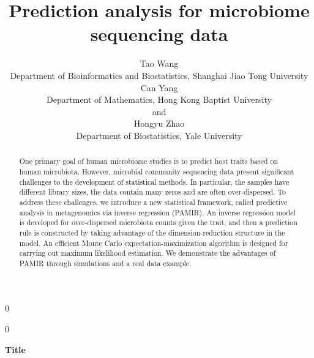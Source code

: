 \documentclass[12pt]{article}
\newcommand{\blind}{0}
\begin{document}
%

\def\spacingset#1{\renewcommand{\baselinestretch}%
{#1}\small\normalsize} \spacingset{1}



\blind
{ \title{\bf Prediction analysis for microbiome sequencing data}
  \author{Tao Wang \\
  \small Department of Bioinformatics and Biostatistics, Shanghai Jiao Tong University\\
  Can Yang \\
  \small Department of Mathematics, Hong Kong Baptist University\\
  and \\
  Hongyu Zhao%
    \\
    \small Department of Biostatistics, Yale University}
  \maketitle
} \fi

\blind
{
  \bigskip
  \bigskip
  \bigskip
  \begin{center}
    {\LARGE\bf Title}
\end{center}
  \medskip
} \fi

\bigskip
\begin{abstract}
One primary goal of human microbiome studies is to predict host traits based on human microbiota. However, microbial community sequencing data present significant challenges to the development of statistical methods. In particular, the samples have different library sizes, the data contain many zeros and are often over-dispersed. To address these challenges, we introduce a new statistical framework, called predictive analysis in metagenomics via inverse regression (PAMIR). An inverse regression model is developed for over-dispersed microbiota counts given the trait, and then a prediction rule is constructed by taking advantage of the dimension-reduction structure in the model. An efficient Monte Carlo expectation-maximization algorithm is designed for carrying out maximum likelihood estimation. We demonstrate the advantages of PAMIR through simulations and a real data example.
\end{abstract}
\end{document}

